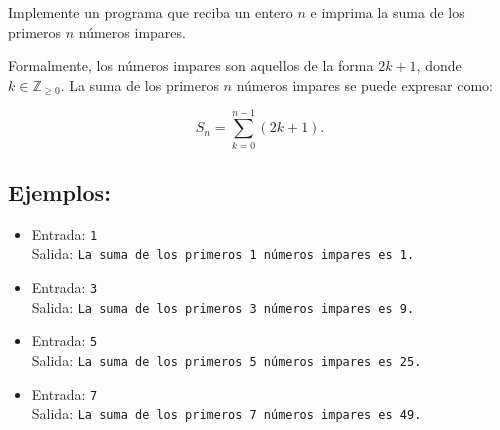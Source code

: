 Implemente un programa que reciba un entero \(n\) e imprima la suma de los primeros \(n\) números impares.

Formalmente, los números impares son aquellos de la forma \(2k + 1\), donde \(k \in \mathbb{Z}_{\geq 0}\). La suma de los primeros \(n\) números impares se puede expresar como:

\[
S_n = \sum_{k=0}^{n-1} (2k + 1).
\]

\subsection*{Ejemplos:}
\begin{itemize}
    \item Entrada: \texttt{1}\\
          Salida: \texttt{La suma de los primeros 1 números impares es 1.}
    \item Entrada: \texttt{3}\\
          Salida: \texttt{La suma de los primeros 3 números impares es 9.}
    \item Entrada: \texttt{5}\\
          Salida: \texttt{La suma de los primeros 5 números impares es 25.}
    \item Entrada: \texttt{7}\\
          Salida: \texttt{La suma de los primeros 7 números impares es 49.}
\end{itemize}
